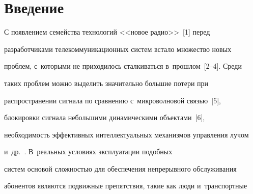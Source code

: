    























      \thispagestyle{headings}


      


  \vspace*{-18pt}


  


\section{Введение}





\vspace*{-4pt}


  


  С появлением семейства технологий <<новое радио>>~[1] перед 


разработчиками телекоммуникационных систем встало множество новых 


проблем, с~которыми не приходилось сталкиваться в~прошлом~[2--4]. Среди 


таких проблем можно выделить значительно большие потери при 


распространении сигнала по сравнению с~микроволновой связью~[5], 


блокировки сигнала небольшими динамическими объектами~[6], 


необходимость эффективных интеллектуальных механизмов управления лучом 


и~др.~\cite{2-bs, 3-bs, 7-bs}. В~реальных условиях эксплуатации подобных 


систем основой сложностью для обеспечения непрерывного обслуживания 


абонентов являются подвижные препятствия, такие как люди и~транспортные 


